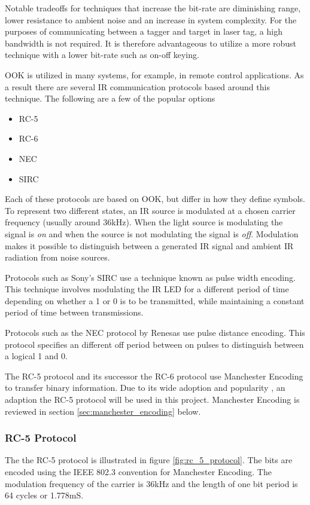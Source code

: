 Notable tradeoffs for techniques that increase the bit-rate are diminishing range, lower resistance to ambient noise and an increase in system complexity. For the purposes of communicating between a tagger and target in laser tag, a high bandwidth is not required. It is therefore advantageous to utilize a more robust technique with a lower bit-rate such as on-off keying.

OOK is utilized in many systems, for example, in remote control applications. As a result there are several IR communication protocols based around this technique. The following are a few of the popular options

\begin{itemize}
	\item RC-5
	\item RC-6
	\item NEC
	\item SIRC
\end{itemize}

Each of these protocols are based on OOK, but differ in how they define symbols. To represent two different states, an IR source is modulated at a chosen carrier frequency (usually around 36kHz). When the light source is modulating the signal is \textit{on} and when the source is not modulating the signal is \textit{off}.  Modulation makes it possible to distinguish between a generated IR signal and ambient IR radiation from noise sources.

Protocols such as Sony's SIRC use a technique known as pulse width encoding. This technique involves modulating the IR LED for a different period of time depending on whether a 1 or 0 is to be transmitted, while maintaining a constant period of time between transmissions.

Protocols such as the NEC protocol by Renesas use pulse distance encoding. This protocol specifies an different off period between on pulses to distinguish between a logical 1 and 0.

The RC-5 protocol and its successor the RC-6 protocol use Manchester Encoding to transfer binary information. Due to its wide adoption and popularity \cite{rudrappa2009}, an adaption the RC-5 protocol will be used in this project. Manchester Encoding is reviewed in section \ref{sec:manchester_encoding} below.

\subsubsection{RC-5 Protocol}
\label{sec:rc_5_protocol}
The the RC-5 protocol is illustrated in figure \ref{fig:rc_5_protocol}. The bits are encoded using the IEEE 802.3 convention for Manchester Encoding. The modulation frequency of the carrier is 36kHz and the length of one bit period is 64 cycles or 1.778mS\cite{Perme2007}.

